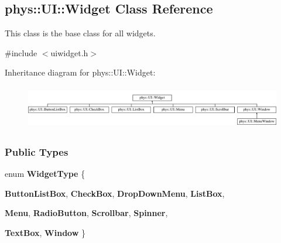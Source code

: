 \hypertarget{classphys_1_1UI_1_1Widget}{
\subsection{phys::UI::Widget Class Reference}
\label{d9/d48/classphys_1_1UI_1_1Widget}
}


This class is the base class for all widgets.  




{\ttfamily \#include $<$uiwidget.h$>$}

Inheritance diagram for phys::UI::Widget:\begin{figure}[H]
\begin{center}
\leavevmode
\includegraphics[height=1.917808cm]{d9/d48/classphys_1_1UI_1_1Widget}
\end{center}
\end{figure}
\subsubsection*{Public Types}
\begin{DoxyCompactItemize}
\item 
enum {\bfseries WidgetType} \{ \par
{\bfseries ButtonListBox}, 
{\bfseries CheckBox}, 
{\bfseries DropDownMenu}, 
{\bfseries ListBox}, 
\par
{\bfseries Menu}, 
{\bfseries RadioButton}, 
{\bfseries Scrollbar}, 
{\bfseries Spinner}, 
\par
{\bfseries TextBox}, 
{\bfseries Window}
 \}
\end{DoxyCompactItemize}

